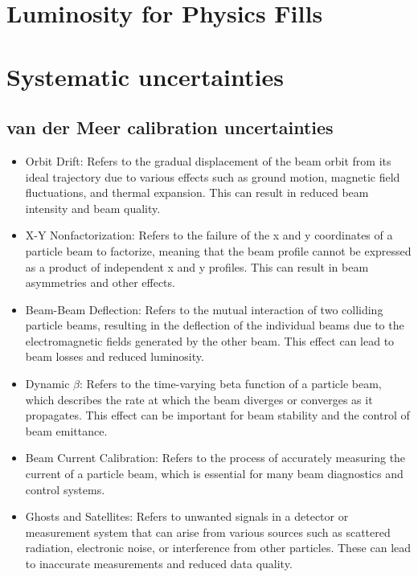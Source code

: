
\section{Luminosity for Physics Fills}


\section{Systematic uncertainties}


\subsection{van der Meer calibration uncertainties}

\begin{itemize}

 \item  Orbit Drift: Refers to the gradual displacement of the beam orbit from its ideal trajectory due to various effects such as ground motion, magnetic field fluctuations, and thermal expansion. This can result in reduced beam intensity and beam quality.

 \item  X-Y Nonfactorization: Refers to the failure of the x and y coordinates of a particle beam to factorize, meaning that the beam profile cannot be expressed as a product of independent x and y profiles. This can result in beam asymmetries and other effects.

 \item Beam-Beam Deflection: Refers to the mutual interaction of two colliding particle beams, resulting in the deflection of the individual beams due to the electromagnetic fields generated by the other beam. This effect can lead to beam losses and reduced luminosity.

 \item Dynamic $\beta$: Refers to the time-varying beta function of a particle beam, which describes the rate at which the beam diverges or converges as it propagates. This effect can be important for beam stability and the control of beam emittance.

\item Beam Current Calibration: Refers to the process of accurately measuring the current of a particle beam, which is essential for many beam diagnostics and control systems.

\item Ghosts and Satellites: Refers to unwanted signals in a detector or measurement system that can arise from various sources such as scattered radiation, electronic noise, or interference from other particles. These can lead to inaccurate measurements and reduced data quality.


\end{itemize}
